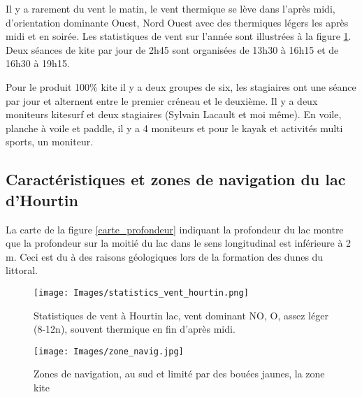\documentclass[11pt,a4paper]{report}
\begin{document}
Il y a rarement du vent le matin, le vent thermique se lève dans
l'après midi, d'orientation dominante Ouest, Nord Ouest avec des
thermiques légers les après midi et  en soirée. Les statistiques
de vent sur l'année sont illustrées à la figure \ref{vent_stats}.
Deux séances de kite par jour de 2h45 sont organisées de
13h30 à 16h15 et de 16h30 à 19h15. 

Pour le produit 100\% kite il y a deux groupes de six, les stagiaires ont
une séance par jour et alternent entre le premier créneau et le deuxième.
Il y a deux moniteurs kitesurf et deux stagiaires (Sylvain Lacault et moi m\^eme).
En voile, planche à voile et paddle, il y a 4 moniteurs et pour le kayak et
activités multi sports, un moniteur.


\subsection{Caractéristiques  et zones de navigation du lac d'Hourtin}

La carte de la figure \ref{carte_profondeur} indiquant la 
profondeur du lac montre que la profondeur sur la moitié du lac
dans le sens longitudinal est inférieure à 2 m. 
Ceci est du à des raisons géologiques lors de la
formation des dunes du littoral.
\begin{figure}
\centering
\texttt{[image: Images/statistics\_vent\_hourtin.png]} 
\caption{Statistiques de vent à Hourtin lac, vent dominant NO, O, assez léger (8-12n), 
souvent thermique en fin d'après midi.\label{vent_stats}}
\end{figure}


\begin{figure}
\texttt{[image: Images/zone\_navig.jpg]}
\caption{Zones de navigation, au sud et limité par des bouées jaunes,
 la zone kite\label{zones_nav}} 
\end{figure}
\end{document}
